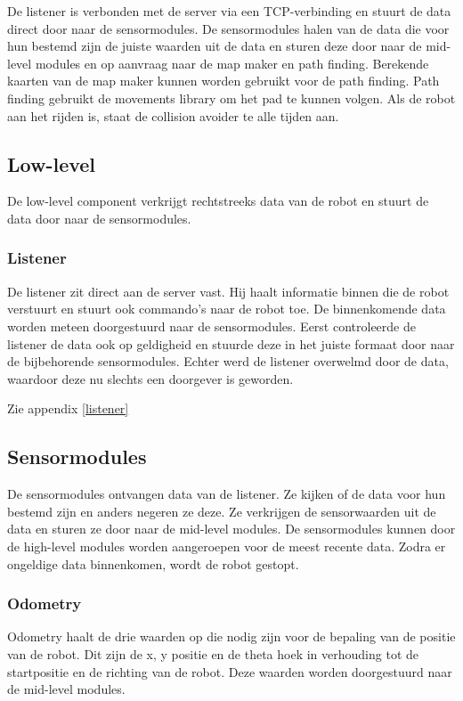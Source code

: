 \documentclass[a4paper,10pt]{article}
\begin{document}
De listener is verbonden met de server via een TCP-verbinding en stuurt de data direct door naar de sensormodules. De sensormodules halen van de data die voor hun bestemd zijn de juiste waarden uit de data en sturen deze door naar de mid-level modules en op aanvraag naar de map maker en path finding. Berekende kaarten van de map maker kunnen worden gebruikt voor de path finding. Path finding gebruikt de movements library om het pad te kunnen volgen. Als de robot aan het rijden is, staat de collision avoider te alle tijden aan.

\subsection{Low-level}
De low-level component verkrijgt rechtstreeks data van de robot en stuurt de data door naar de sensormodules.

\subsubsection{Listener}
De listener zit direct aan de server vast. Hij haalt informatie binnen die de robot verstuurt en stuurt ook commando's naar de robot toe. De binnenkomende data worden meteen doorgestuurd naar de sensormodules. Eerst controleerde de listener de data ook op geldigheid en stuurde deze in het juiste formaat door naar de bijbehorende sensormodules. Echter werd de listener overwelmd door de data, waardoor deze nu slechts een doorgever is geworden.

Zie appendix \ref{listener}

\subsection{Sensormodules}
De sensormodules ontvangen data van de listener. Ze kijken of de data voor hun bestemd zijn en anders negeren ze deze. Ze verkrijgen de sensorwaarden uit de data en sturen ze door naar de mid-level modules. De sensormodules kunnen door de high-level modules worden aangeroepen voor de meest recente data. Zodra er ongeldige data binnenkomen, wordt de robot gestopt.

\subsubsection{Odometry}
Odometry haalt de drie waarden op die nodig zijn voor de bepaling van de positie van de robot. Dit zijn de x, y positie en de theta hoek in verhouding tot de startpositie en de richting van de robot. Deze waarden worden doorgestuurd naar de mid-level modules.
\end{document}
